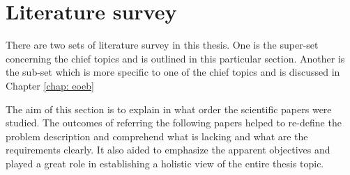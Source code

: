 \chapter{Literature survey}
\label{chap: ls}

There are two sets of literature survey in this thesis. One is the super-set concerning the chief topics and is outlined in this particular section. Another is the sub-set which is more specific to one of the chief topics and is discussed in Chapter \ref{chap: eoeb}

The aim of this section is to explain in what order the scientific papers were studied. The outcomes of referring the following papers helped to re-define the problem description and comprehend what is lacking and what are the requirements clearly. It also aided to emphasize the apparent objectives and played a great role in establishing a holistic view of the entire thesis topic.

